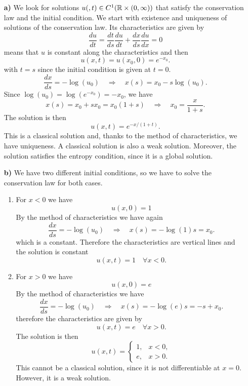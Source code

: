 \begin{itemize}
    \item[\textbf{a)}] We look for solutions \(u(, t) \in C^1(\mathbb{R} \times (0, \infty))\) that satisfy the conservation law and the initial condition. 
    We start with existence and uniqueness of solutions of the conservation law.
    Its characteristics are given by
    \[
        \frac{du}{dt} = \frac{dt}{ds} \frac{du}{dt} + \frac{dx}{ds} \frac{du}{dx} = 0
    \]
    means that \(u\) is constant along the characteristics and then 
    \[
        u(x,t) = u(x_0,0) = e^{-x_0}.
    \]
    with \(t=s\) since the initial condition is given at \(t=0\). 
    \[
        \frac{dx}{ds} = -\log(u_0) \quad \Rightarrow \quad x(s) = x_0 - s \log(u_0).
    \]
    Since \(\log(u_0) = \log(e^{-x_0}) = -x_0\), we have
    \[
        x(s) = x_0 + s x_0 = x_0(1+s) \quad \Rightarrow \quad x_0 = \frac{x}{1+s}.
    \]
    The solution is then
    \[
        u(x,t) = e^{-x/(1+t)}.
    \]
    This is a classical solution and, thanks to the method of characteristics, we have uniqueness. A classical solution is also a weak solution. Moreover, the solution satisfies the entropy condition, since it is a global solution.
    \item[\textbf{b)}] We have two different initial conditions, so we have to solve the conservation law for both cases. 
    \begin{enumerate}
        \item For \(x < 0\) we have
        \[
            u(x,0) = 1
        \]
        By the method of characteristics we have again 
        \[
            \frac{dx}{ds} = -\log(u_0) \quad \Rightarrow \quad x(s) = -\log(1)s = x_0.
        \]
        which is a constant. Therefore the characteristics are vertical lines and the solution is constant 
        \[
            u(x,t) = 1 \quad \forall x < 0.
        \]
        \item For \(x > 0\) we have
        \[
            u(x,0) = e
        \]
        By the method of characteristics we have
        \[
            \frac{dx}{ds} = -\log(u_0) \quad \Rightarrow \quad x(s) = -\log(e)s = -s + x_0.
        \]
        therefore the characteristics are given by
        \[
            u(x,t) = e \quad \forall x > 0.
        \]
        The solution is then
        \[
            u(x,t) = \begin{cases}
                1, & x < 0, \\
                e, & x > 0.
            \end{cases}
        \]
        This cannot be a classical solution, since it is not differentiable at \(x=0\). However, it is a weak solution. 

\end{enumerate}
\end{itemize}

